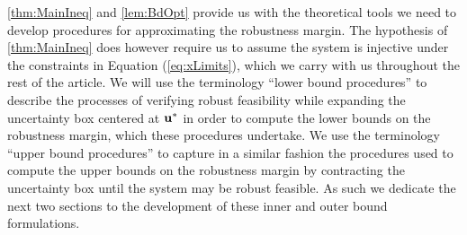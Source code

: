 \cref{thm:MainIneq} and \cref{lem:BdOpt} provide us with the theoretical tools we need to develop procedures for approximating the robustness margin.
The hypothesis of \cref{thm:MainIneq} does however require us to assume the system is injective under the constraints in Equation (\ref{eq:xLimits}), which we carry with us throughout the rest of the article. 
We will use the terminology \enquote{lower bound procedures} to describe the processes of verifying robust feasibility while expanding the uncertainty box centered at $\mathbf{u}^*$ in order to compute the lower bounds on the robustness margin, which these procedures undertake. 
We use the terminology \enquote{upper bound procedures} to capture in a similar fashion the procedures used to compute the upper bounds on the robustness margin by contracting the uncertainty box until the system may be robust feasible. 
As such we dedicate the next two sections to the development of these inner and outer bound formulations. 
